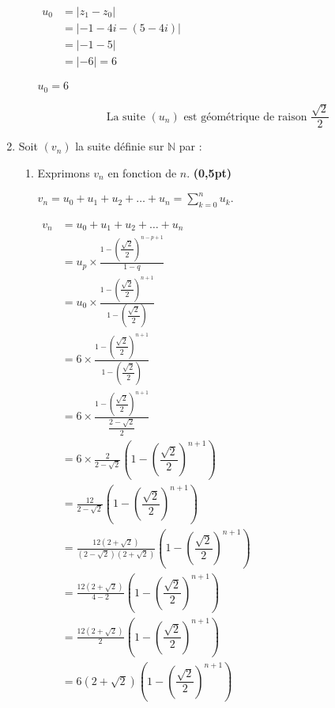 \documentclass[12pt,a4paper]{article}
\begin{document}
\begin{enumerate}
\begin{enumerate}
\(
\begin{aligned}
u_0 &= |z_1 - z_0| \\
    &= |-1 - 4i - (5 - 4i)| \\
    &= |-1 - 5| \\
    &= |-6| = 6
\end{aligned}
\)

\(
\boxed{u_0 = 6}
\)


\begin{resultbox}
\[
\boxed{
\text{La suite } (u_n) \text{ est géométrique  de raison } \frac{\sqrt{2}}{2}
}
\]
\end{resultbox}

\end{enumerate}
\item Soit \( (v_n) \) la suite définie sur \( \mathbb{N} \) par :

\begin{enumerate}
\item Exprimons \( v_n \) en fonction de \( n \). \hfill \textbf{(0,5pt)}

    \( v_n = u_0 + u_1 + u_2 + \dots + u_n = \sum_{k=0}^{n} u_k. \)

\( 
\begin{aligned}
    v_n &= u_0 + u_1 + u_2 + \dots + u_n \\
        &= u_p \times \frac{1 - \left(\dfrac{\sqrt{2}}{2}\right)^{n - p + 1}}{1 - q} \\
        &= u_0 \times \frac{1 - \left(\dfrac{\sqrt{2}}{2}\right)^{n + 1}}{1 - \left(\dfrac{\sqrt{2}}{2}\right)} \\
        &= 6 \times \frac{1 - \left(\dfrac{\sqrt{2}}{2}\right)^{n + 1}}{1 - \left(\dfrac{\sqrt{2}}{2}\right)}\\
        &= 6 \times \frac{1 - \left(\dfrac{\sqrt{2}}{2}\right)^{n + 1}}{\dfrac{2 - \sqrt{2}}{2}} \\
        &= 6 \times \frac{2}{2 - \sqrt{2}} \left(1 - \left(\dfrac{\sqrt{2}}{2}\right)^{n + 1}\right) \\
        &= \frac{12}{2 - \sqrt{2}} \left(1 - \left(\dfrac{\sqrt{2}}{2}\right)^{n + 1}\right)\\
        &=\frac{12(2 + \sqrt{2})}{(2 - \sqrt{2})(2 + \sqrt{2})}\left(1 - \left(\dfrac{\sqrt{2}}{2}\right)^{n + 1}\right)\\
        &=\frac{12(2 + \sqrt{2})}{4 - 2}\left(1 - \left(\dfrac{\sqrt{2}}{2}\right)^{n + 1}\right)\\
        &=\frac{12(2 + \sqrt{2})}{2}\left(1 - \left(\dfrac{\sqrt{2}}{2}\right)^{n + 1}\right)\\
        &=6(2 + \sqrt{2})\left(1 - \left(\dfrac{\sqrt{2}}{2}\right)^{n + 1}\right)
\end{aligned}
\)


\end{enumerate}
\end{enumerate}
\end{document}
